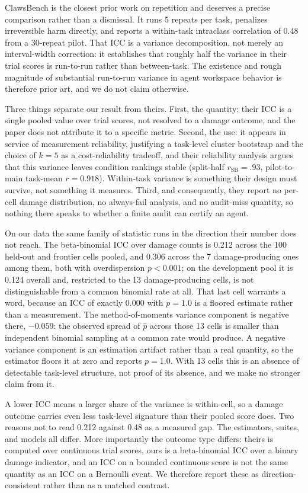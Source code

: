 \documentclass{article}
\begin{document}
ClawsBench is the closest prior work on repetition and deserves a precise
comparison rather than a dismissal. It runs 5 repeats per task, penalizes
irreversible harm directly, and reports a within-task intraclass correlation of
0.48 from a 30-repeat pilot. That ICC is a variance decomposition, not merely an
interval-width correction: it establishes that roughly half the variance in their
trial scores is run-to-run rather than between-task. The existence and rough
magnitude of substantial run-to-run variance in agent workspace behavior is
therefore prior art, and we do not claim otherwise.

Three things separate our result from theirs. First, the quantity: their ICC is a
single pooled value over trial scores, not resolved to a damage outcome, and the
paper does not attribute it to a specific metric. Second, the use: it appears in
service of measurement reliability, justifying a task-level cluster bootstrap and
the choice of $k=5$ as a cost-reliability tradeoff, and their reliability analysis
argues that this variance leaves condition rankings stable (split-half
$r_{\mathrm{SB}} = .93$, pilot-to-main task-mean $r = 0.918$). Within-task
variance is something their design must survive, not something it measures.
Third, and consequently, they report no per-cell damage distribution, no
always-fail analysis, and no audit-miss quantity, so nothing there speaks to
whether a finite audit can certify an agent.

On our data the same family of statistic runs in the direction their number does
not reach. The beta-binomial ICC over damage counts is 0.212 across the 100
held-out and frontier cells pooled, and 0.306 across the 7 damage-producing ones
among them, both
with overdispersion $p < 0.001$; on the development pool it is 0.124 overall and,
restricted to the 13 damage-producing cells, is not distinguishable from a common
binomial rate at all. That last cell warrants a word, because an ICC of exactly
0.000 with $p = 1.0$ is a floored estimate rather than a measurement. The
method-of-moments variance component is negative there, $-0.059$: the observed
spread of $\hat{p}$ across those 13 cells is smaller than independent binomial
sampling at a common rate would produce. A negative
variance component is an estimation artifact rather than a real quantity, so the
estimator floors it at zero and reports $p = 1.0$. With 13 cells this is an
absence of detectable task-level structure, not proof of its absence, and we make
no stronger claim from it.

A lower ICC means a larger share of the variance is within-cell, so a damage
outcome carries even less task-level signature than their pooled score does. Two
reasons not to read 0.212 against 0.48 as a measured gap. The estimators, suites,
and models all differ. More importantly the outcome type differs: theirs is
computed over continuous trial scores, ours is a beta-binomial ICC over a binary
damage indicator, and an ICC on a bounded continuous score is not the same
quantity as an ICC on a Bernoulli event. We therefore report these as
direction-consistent rather than as a matched contrast.
\end{document}
